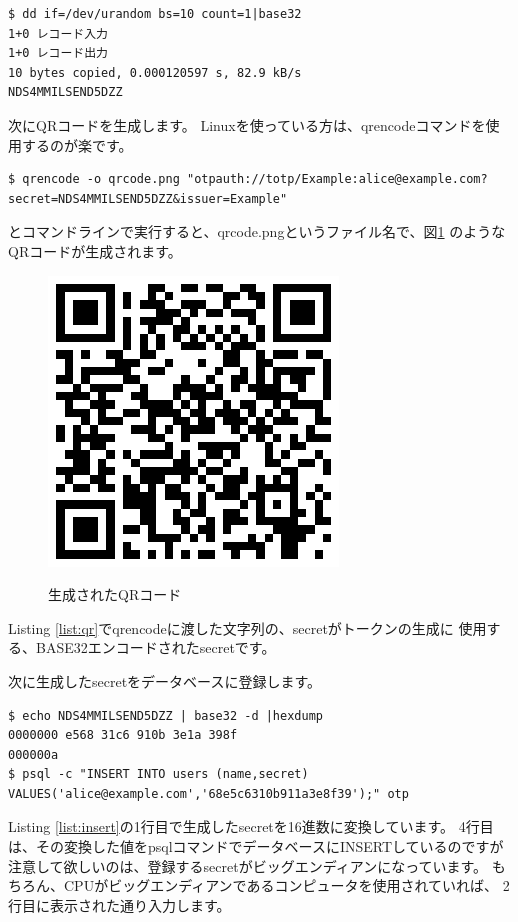 \begin{lstlisting}[caption=secret生成の例,label=list:secret]
$ dd if=/dev/urandom bs=10 count=1|base32
1+0 レコード入力
1+0 レコード出力
10 bytes copied, 0.000120597 s, 82.9 kB/s
NDS4MMILSEND5DZZ
\end{lstlisting}

次にQRコードを生成します。
Linuxを使っている方は、qrencodeコマンドを使用するのが楽です。
\begin{lstlisting}[caption=QRコード生成の例,label=list:qr]
$ qrencode -o qrcode.png "otpauth://totp/Example:alice@example.com?secret=NDS4MMILSEND5DZZ&issuer=Example"
\end{lstlisting}
とコマンドラインで実行すると、qrcode.pngというファイル名で、図\ref{fig:qr}
のようなQRコードが生成されます。

\begin{figure}
  \begin{center}
    \includegraphics{qrcode.eps} \label{fig:qr}
  \end{center}
  \caption{生成されたQRコード}
\end{figure}
%
Listing \ref{list:qr}でqrencodeに渡した文字列の、secretがトークンの生成に
使用する、BASE32エンコードされたsecretです。

次に生成したsecretをデータベースに登録します。
\begin{lstlisting}[caption=データベースへの登録,label=list:insert]
$ echo NDS4MMILSEND5DZZ | base32 -d |hexdump
0000000 e568 31c6 910b 3e1a 398f               
000000a
$ psql -c "INSERT INTO users (name,secret) VALUES('alice@example.com','68e5c6310b911a3e8f39');" otp
\end{lstlisting}
Listing \ref{list:insert}の1行目で生成したsecretを16進数に変換しています。
4行目は、その変換した値をpsqlコマンドでデータベースにINSERTしているのですが
注意して欲しいのは、登録するsecretがビッグエンディアンになっています。
もちろん、CPUがビッグエンディアンであるコンピュータを使用されていれば、
2行目に表示された通り入力します。

